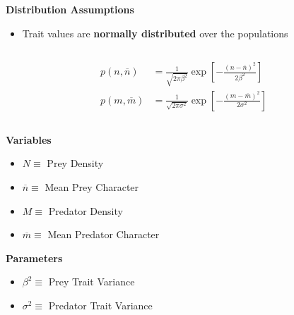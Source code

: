 \documentclass[10pt]{beamer}
\begin{document}
\begin{frame}
	\frametitle{}
	{\bf Distribution Assumptions}
	\begin{itemize}
		\item Trait values are {\bf normally distributed} over the populations
	\end{itemize}
	\begin{columns}
		\begin{column}{0.48\textwidth}
			\begin{align*}
				p(n, \overline{n}) &= \frac{1}{\sqrt{2\pi\beta^2}}\exp\left[{-\frac{(n - \overline{n})^2}{2\beta^2}}\right] \\
				p(m, \overline{m}) &= \frac{1}{\sqrt{2\pi\sigma^2}}\exp\left[{-\frac{(m - \overline{m})^2}{2\sigma^2}}\right]
			\end{align*}
		\end{column}
	\end{columns}
	{\bf Variables}
	\begin{itemize}
		\item $N \equiv $ Prey Density
		\item $\overline{n} \equiv $ Mean Prey Character
		\item $M \equiv $ Predator Density
		\item $\overline{m} \equiv $ Mean Predator Character
	\end{itemize}
	{\bf Parameters}
	\begin{itemize}
		\item $\beta^2 \equiv $ Prey Trait Variance
		\item $\sigma^2 \equiv $ Predator Trait Variance
	\end{itemize}
\end{frame}
\end{document}
